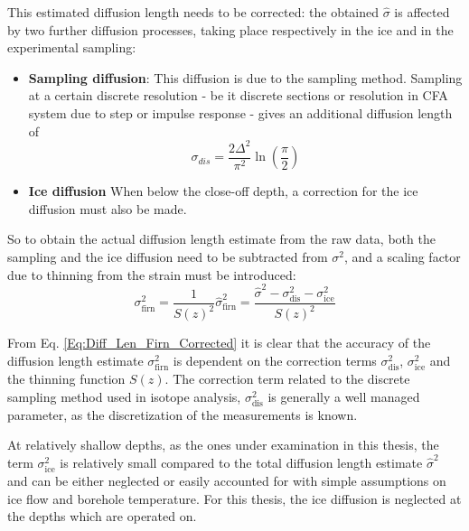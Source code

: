 \documentclass[../../CompleteThesis2/Complete_2ndDraft]{subfiles}
\begin{document}
This estimated diffusion length needs to be corrected: the obtained $\hat{\sigma}$ is affected by two further diffusion processes, taking place respectively in the ice and in the experimental sampling:
\begin{itemize}
	\item \textbf{Sampling diffusion}: This diffusion is due to the sampling method. Sampling at a certain discrete resolution - be it discrete sections or resolution in CFA system due to step or impulse response - gives an additional diffusion length of
	\begin{equation}
		\sigma_{dis} = \frac{2 \Delta^2}{\pi^2}\ln\left(\frac{\pi}{2}\right)
		\label{Eq:Diff_Len_corr_Discrete}
	\end{equation}
	\item \textbf{Ice diffusion} When below the close-off depth, a correction for the ice diffusion must also be made.
\end{itemize} 

So to obtain the actual diffusion length estimate from the raw data, both the sampling and the ice diffusion need to be subtracted from $\sigma^2$, and a scaling factor due to thinning from the strain must be introduced:
\begin{equation}
	\sigma_{\text{firn}}^2 = \frac{1}{S(z)^2}\hat{\sigma}_{\text{firn}}^2 = \frac{\hat{\sigma}^2 - \sigma_{\text{dis}}^2 - \sigma_{\text{ice}}^2}{S(z)^2}
	\label{Eq:Diff_Len_Firn_Corrected}
\end{equation}

From Eq. \ref{Eq:Diff_Len_Firn_Corrected} it is clear that the accuracy of the diffusion length estimate $\sigma_{\text{firn}}^2$ is dependent on the correction terms $\sigma_{\text{dis}}^2$, $\sigma_{\text{ice}}^2$ and the thinning function $S(z)$. The correction term related to the discrete sampling method used in isotope analysis, $\sigma_{\text{dis}}^2$ is generally a well managed parameter, as the discretization of the measurements is known. 

At relatively shallow depths, as the ones under examination in this thesis, the term $\sigma_{\text{ice}}^2$ is relatively small compared to the total diffusion length estimate $\hat{\sigma}^2$ and can be either neglected or easily accounted for with simple assumptions on ice flow and borehole temperature. For this thesis, the ice diffusion is neglected at the depths which are operated on.
\end{document}
